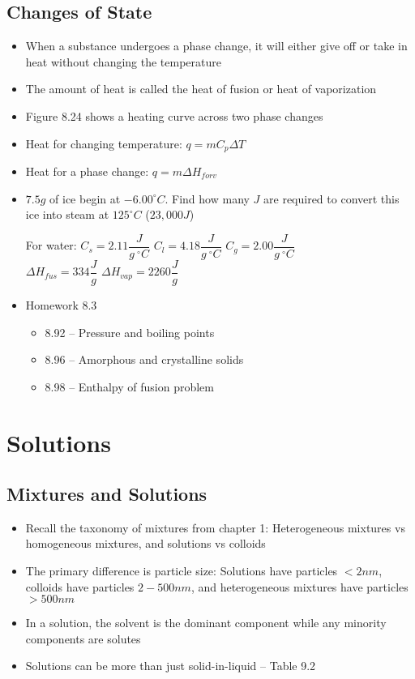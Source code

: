 \documentclass[12pt, openany, letterpaper]{memoir}
\begin{document}
\section{Changes of State}
\begin{itemize}
	\item When a substance undergoes a phase change, it will either give off or take in heat without changing the temperature
	\item The amount of heat is called the heat of fusion or heat of vaporization
	\item Figure 8.24 shows a heating curve across two phase changes
	\item Heat for changing temperature: $q=mC_p\Delta T$
	\item Heat for a phase change: $q=m\Delta H_{f or v}$
	\item $7.5g$ of ice begin at $-6.00^\circ C$. Find how many $J$ are required to convert this ice into steam at $125^\circ C$ ($23,000J$)
	
	For water: $C_{s}=2.11\dfrac{J}{g~^\circ C}$ \hspace{1em} $C_{l}=4.18\dfrac{J}{g~^\circ C}$ \hspace{1em} $C_{g}=2.00\dfrac{J}{g~^\circ C}$ \\ \hphantom{For Water:} $\Delta H_{fus} = 334\dfrac{J}{g}$ \hspace{1em} $\Delta H_{vap} = 2260\dfrac{J}{g}$
	\item Homework 8.3
	\begin{itemize}
		\item 8.92 -- Pressure and boiling points
		\item 8.96 -- Amorphous and crystalline solids
		\item 8.98 -- Enthalpy of fusion problem
	\end{itemize}
\end{itemize}

\chapter{Solutions}
\section{Mixtures and Solutions}
\begin{itemize}
	\item Recall the taxonomy of mixtures from chapter 1: Heterogeneous mixtures vs homogeneous mixtures, and solutions vs colloids
	\item The primary difference is particle size: Solutions have particles $<2nm$, colloids have particles $2-500nm$, and heterogeneous mixtures have particles $>500nm$
	\item In a solution, the solvent is the dominant component while any minority components are solutes
	\item Solutions can be more than just solid-in-liquid -- Table 9.2
\end{itemize}
\end{document}
